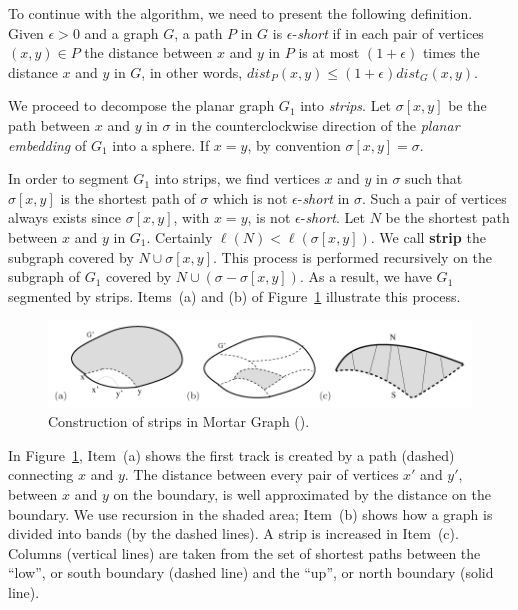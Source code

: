 To continue with the algorithm, we need to present the following definition. Given $\epsilon > 0$ and a graph \(G\), a path \(P\) in \(G\) is \(\epsilon\)-\textit{short} if in each pair of vertices \((x, y) \in P\) the distance between \(x\) and \(y\) in \(P\) is at most \((1 + \epsilon)\) times the distance \(x\) and \(y\) in \(G\), in other words, \(dist_P(x, y) \leq (1 + \epsilon) dist_G(x, y)\).

We proceed to decompose the planar graph \(G_1\) into \textit{strips}. Let \(\sigma[x, y]\) be the path between \(x\) and \(y\) in \(\sigma\) in the counterclockwise direction of the \textit{planar embedding} of \(G_1\) into a sphere. If \(x = y\), by convention \(\sigma[x, y] = \sigma\).

In order to segment \(G_1\) into strips, we find vertices \(x\) and \(y\) in \(\sigma\) such that \(\sigma[x, y]\) is the shortest path of \(\sigma\) which is not \(\epsilon\)-\textit{short} in \(\sigma\). Such a pair of vertices always exists since \(\sigma[x, y]\), with \(x = y\), is not \(\epsilon\)-\textit{short}. Let \(N\) be the shortest path between \(x\) and \(y\) in \(G_1\). Certainly \(\ell(N) < \ell(\sigma[x, y])\). We call \textbf{strip} the subgraph covered by \(N \cup \sigma[x, y]\). This process is performed recursively on the subgraph of \(G_1\) covered by \(N \cup (\sigma - \sigma[x, y])\). As a result, we have \(G_1\) segmented by strips. Items~(a) and (b) of Figure~\ref{fig:mortar2} illustrate this process.

\begin{figure}[h]
    \centering
    \includegraphics[scale=0.5]{imgs/mortar2.png}
    \caption{Construction of strips in Mortar Graph (\cite{Borradaile2009b}).}
    \label{fig:mortar2}
\end{figure}

In Figure~\ref{fig:mortar2}, Item~(a) shows the first track is created by a path (dashed) connecting \(x\) and \(y\). The distance between every pair of vertices \(x'\) and \(y'\), between \(x\) and \(y\) on the boundary, is well approximated by the distance on the boundary. We use recursion in the shaded area; Item~(b) shows how a graph is divided into bands (by the dashed lines). A strip is increased in Item~(c). Columns (vertical lines) are taken from the set of shortest paths between the ``low'', or south boundary (dashed line) and the ``up'', or north boundary (solid line).

